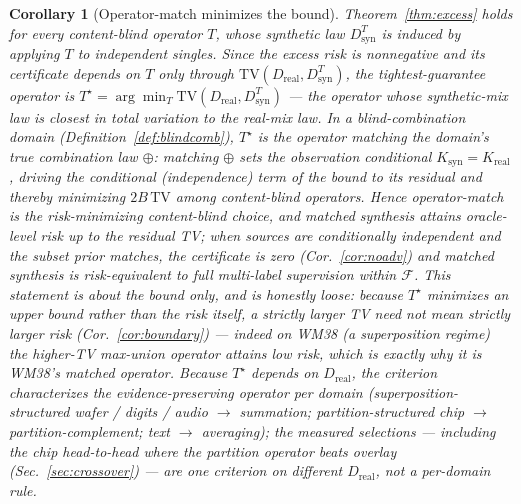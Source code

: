 \documentclass[11pt]{article}
\newtheorem{corollary}{Corollary}
\begin{document}
\begin{corollary}[Operator-match minimizes the bound]\label{cor:opmatch}
Theorem~\ref{thm:excess} holds for \emph{every} content-blind operator $T$,
whose synthetic law $D_{\mathrm{syn}}^{T}$ is induced by applying $T$ to
independent singles. Since the excess risk is nonnegative and its certificate
depends on $T$ only through $\mathrm{TV}(D_{\mathrm{real}},D_{\mathrm{syn}}^{T})$,
the tightest-guarantee operator is
$T^\star=\arg\min_T \mathrm{TV}(D_{\mathrm{real}},D_{\mathrm{syn}}^{T})$ --- the
operator whose synthetic-mix law is closest in total variation to the real-mix
law. In a blind-combination domain (Definition~\ref{def:blindcomb}), $T^\star$ is the
operator matching the domain's true combination law $\oplus$: matching $\oplus$ sets the
observation conditional $K_{\mathrm{syn}}=K_{\mathrm{real}}$, driving the conditional
(independence) term of the bound to its residual and thereby minimizing $2B\,\mathrm{TV}$
among content-blind operators. Hence \emph{operator-match is the risk-minimizing
content-blind choice}, and matched synthesis attains oracle-level risk up to the residual
TV; when sources are conditionally independent and the subset prior matches, the
certificate is zero (Cor.~\ref{cor:noadv}) and matched synthesis is risk-equivalent to
full multi-label supervision within $\mathcal F$. This statement is about the bound only,
and is honestly loose:
because $T^\star$ minimizes an upper bound rather than the risk itself, a strictly
larger TV need not mean strictly larger risk (Cor.~\ref{cor:boundary}) --- indeed on
WM38 (a superposition regime) the higher-TV max-union operator attains low risk,
which is exactly why it is WM38's matched operator. Because $T^\star$ depends on
$D_{\mathrm{real}}$, the criterion characterizes the evidence-preserving operator per
domain (superposition-structured wafer / digits / audio $\to$ summation;
partition-structured chip $\to$ partition-complement; text $\to$ averaging); the
measured selections --- including the chip head-to-head where the partition operator
beats overlay (Sec.~\ref{sec:crossover}) --- are one criterion on different
$D_{\mathrm{real}}$, not a per-domain rule.
\end{corollary}
\end{document}
